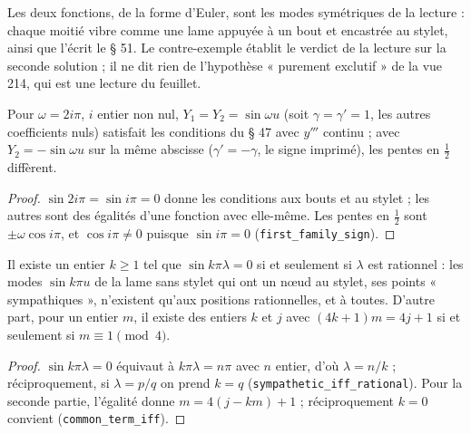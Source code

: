 \begin{remarque}
Les deux fonctions, de la forme d'Euler, sont les modes symétriques de la lecture : chaque moitié vibre comme une lame appuyée à un bout et encastrée au stylet, ainsi que l'écrit le § 51. Le contre-exemple établit le verdict de la lecture sur la seconde solution ; il ne dit rien de l'hypothèse « purement exclutif » de la vue 214, qui est une lecture du feuillet.
\end{remarque}

\begin{enonce}
Pour $\omega = 2i\pi$, $i$ entier non nul, $Y_1 = Y_2 = \sin\omega u$ (soit $\gamma = \gamma' = 1$, les autres coefficients nuls) satisfait les conditions du § 47 avec $y'''$ continu ; avec $Y_2 = -\sin\omega u$ sur la même abscisse ($\gamma' = -\gamma$, le signe imprimé), les pentes en $\frac12$ diffèrent.
\end{enonce}

\begin{proof}
$\sin 2i\pi = \sin i\pi = 0$ donne les conditions aux bouts et au stylet ; les autres sont des égalités d'une fonction avec elle-même. Les pentes en $\frac12$ sont $\pm\omega\cos i\pi$, et $\cos i\pi \neq 0$ puisque $\sin i\pi = 0$ (\texttt{first\_family\_sign}).
\end{proof}

\begin{enonce}
Il existe un entier $k \geq 1$ tel que $\sin k\pi\lambda = 0$ si et seulement si $\lambda$ est rationnel : les modes $\sin k\pi u$ de la lame sans stylet qui ont un nœud au stylet, ses points « sympathiques », n'existent qu'aux positions rationnelles, et à toutes. D'autre part, pour un entier $m$, il existe des entiers $k$ et $j$ avec $(4k+1)m = 4j+1$ si et seulement si $m \equiv 1 \pmod 4$.
\end{enonce}

\begin{proof}
$\sin k\pi\lambda = 0$ équivaut à $k\pi\lambda = n\pi$ avec $n$ entier, d'où $\lambda = n/k$ ; réciproquement, si $\lambda = p/q$ on prend $k = q$ (\texttt{sympathetic\_iff\_rational}). Pour la seconde partie, l'égalité donne $m = 4(j - km) + 1$ ; réciproquement $k = 0$ convient (\texttt{common\_term\_iff}).
\end{proof}

